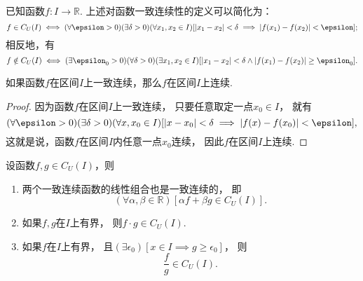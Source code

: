已知函数\(f\colon I\to\mathbb{R}\).
上述对函数一致连续性的定义可以简化为：\begin{equation*}
	f \in C_U(I)
	\iff
	(\forall\epsilon>0)
	(\exists\delta>0)
	(\forall x_1,x_2 \in I)
	[
		\abs{x_1 - x_2} < \delta
		\implies
		\abs{f(x_1) - f(x_2)} < \epsilon
	];
\end{equation*}
相反地，有\begin{equation*}
	f \notin C_U(I)
	\iff
	(\exists\epsilon_0>0)
	(\forall\delta>0)
	(\exists x_1,x_2 \in I)
	[
		\abs{x_1-x_2}<\delta
		\land
		\abs{f(x_1)-f(x_2)}\geq\epsilon_0
	].
\end{equation*}

\begin{theorem}\label{theorem:极限.闭区间上连续函数的性质.一致连续函数一定连续}
如果函数\(f\)在区间\(I\)上一致连续，那么\(f\)在区间\(I\)上连续.
\begin{proof}
因为函数\(f\)在区间\(I\)上一致连续，
只要任意取定一点\(x_0 \in I\)，
就有\begin{equation*}
	(\forall \epsilon > 0)
	(\exists \delta > 0)
	(\forall x,x_0 \in I)
	[
		\abs{x-x_0} < \delta
		\implies
		\abs{f(x)-f(x_0)} < \epsilon
	],
\end{equation*}
这就是说，函数\(f\)在区间\(I\)内任意一点\(x_0\)连续，
因此\(f\)在区间\(I\)上连续.
\end{proof}
\end{theorem}

\begin{theorem}[一致连续函数的四则运算法则]\label{theorem:极限.闭区间上连续函数的性质.一致连续函数的四则运算法则}
设函数\(f,g \in C_U(I)\)，则
\begin{enumerate}
	\item 两个一致连续函数的线性组合也是一致连续的，
	即\begin{equation*}
		(\forall\alpha,\beta\in\mathbb{R})
		[\alpha f + \beta g \in C_U(I)].
	\end{equation*}

	\item 如果\(f,g\)在\(I\)上有界，
	则\(f \cdot g \in C_U(I)\).

	\item 如果\(f\)在\(I\)上有界，
	且\((\exists\epsilon_0)
	[x \in I \implies g \geq \epsilon_0]\)，
	则\begin{equation*}
		\frac{f}{g} \in C_U(I).
	\end{equation*}
\end{enumerate}
\end{theorem}

